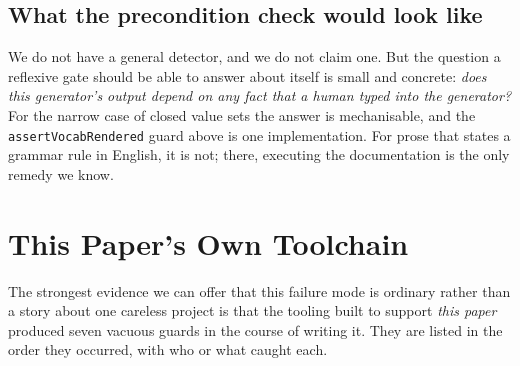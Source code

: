 \documentclass[10pt,journal,compsoc]{IEEEtran}
\begin{document}
\subsection{What the precondition check would look like}

We do not have a general detector, and we do not claim one. But the question a reflexive
gate should be able to answer about itself is small and concrete: \emph{does this
generator's output depend on any fact that a human typed into the generator?} For the
narrow case of closed value sets the answer is mechanisable, and the
\texttt{assertVocabRendered} guard above is one implementation. For prose that states a
grammar rule in English, it is not; there, executing the documentation is the only
remedy we know.

\section{This Paper's Own Toolchain}\label{sec:self}

The strongest evidence we can offer that this failure mode is ordinary rather than a
story about one careless project is that the tooling built to support \emph{this paper}
produced seven vacuous guards in the course of writing it. They are listed in the order
they occurred, with who or what caught each.
\end{document}
